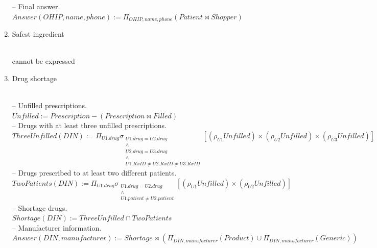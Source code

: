 \documentclass{article}
\newcommand{\var}[1]{\mathit{#1}}
\begin{document}
\begin{enumerate}
{-- Final answer. \\[5pt]
$
Answer(\var{OHIP}, \var{name}, \var{phone}) :=
  \Pi_{\var{OHIP}, \var{name}, \var{phone}}
  (\var{Patient} \bowtie Shopper)
$
}

\item {\large Safest ingredient}

{~}\\
{\large
cannot be expressed
}

\item {\large Drug shortage}

{~}\\
{\large
-- Unfilled prescriptions. \\[5pt]
$
Unfilled :=
  \var{Prescription}
  -
  (\var{Prescription} \bowtie \var{Filled})
$ \\[10pt]

-- Drugs with at least three unfilled prescriptions. \\[5pt]
$
ThreeUnfilled(\var{DIN}) :=
  \Pi_{U1.\var{drug}}
  \sigma_{\substack{
    U1.\var{drug} = U2.\var{drug} \\
    \wedge \\
    U2.\var{drug} = U3.\var{drug} \\
    \wedge \\
    U1.\var{RxID} \neq U2.\var{RxID} \neq U3.\var{RxID}
  }}
  [ (\rho_{U1}Unfilled) \times (\rho_{U2}Unfilled) \times (\rho_{U3}Unfilled) ]
$ \\[10pt]

-- Drugs prescribed to at least two different patients. \\[5pt]
$
TwoPatients(\var{DIN}) :=
  \Pi_{U1.\var{drug}}
  \sigma_{\substack{
    U1.\var{drug} = U2.\var{drug} \\
    \wedge \\
    U1.\var{patient} \neq U2.\var{patient}
  }}
  [ (\rho_{U1}Unfilled) \times (\rho_{U2}Unfilled) ]
$ \\[10pt]

-- Shortage drugs. \\[5pt]
$
Shortage(\var{DIN}) :=
  ThreeUnfilled \cap TwoPatients
$ \\[10pt]

-- Manufacturer information. \\[5pt]
$
Answer(\var{DIN}, \var{manufacturer}) :=
  Shortage \bowtie
  (\Pi_{\var{DIN}, \var{manufacturer}}(\var{Product})
   \cup
   \Pi_{\var{DIN}, \var{manufacturer}}(\var{Generic}))
$
}


\end{enumerate}
\end{document}
